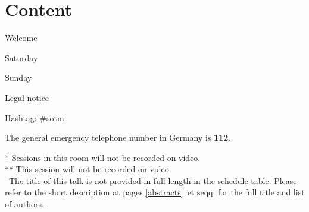 \section*{Content}

\vspace*{0.35em}%
\noindent Welcome\dotfill \pageref{welcome}
%
%
%

\vspace*{0.35em}%
\noindent Saturday \dotfill \pageref{saturday}

\vspace*{0.35em}%
\noindent Sunday \dotfill \pageref{sunday}
%
%
%
%

\vspace*{0.35em}%
\noindent Legal notice \dotfill \pageref{legal}

\vfill
\noindent
Hashtag: \#sotm

\vspace*{0.8em}%
\noindent
The general emergency telephone number in Germany is \textbf{112}.
\vfill

\small{
\noindent
  \** Sessions in this room will not be recorded on video.\\
  \**\** This session will not be recorded on video.\\
  \diamondSymbol\ The title of this talk is not provided in full length in the schedule table. Please refer to the short description at pages \ref{abstracts}~et seqq. for the full title and list of authors.
}\normalsize


\newpage
